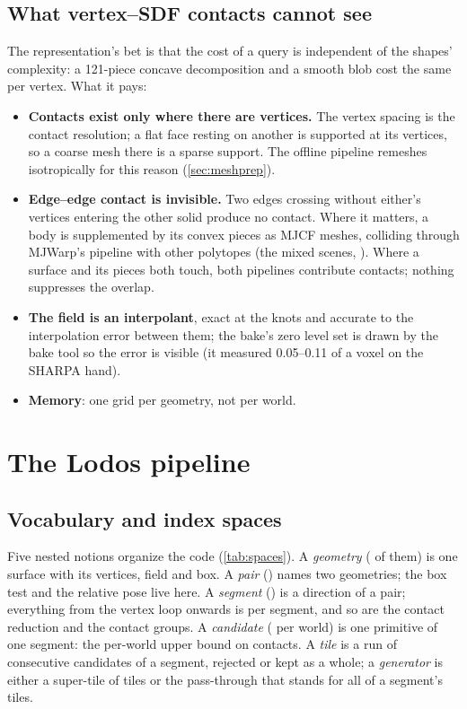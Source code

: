 \subsection{What vertex--SDF contacts cannot see}\label{sec:limits-vsdf}

The representation's bet is that the cost of a query is independent of the shapes' complexity: a 121-piece concave decomposition and a smooth blob cost the same per vertex. What it pays:

\begin{itemize}
\item \textbf{Contacts exist only where there are vertices.} The vertex spacing is the contact resolution; a flat face resting on another is supported at its vertices, so a coarse mesh there is a sparse support. The offline pipeline remeshes isotropically for this reason (\cref{sec:meshprep}).
\item \textbf{Edge--edge contact is invisible.} Two edges crossing without either's vertices entering the other solid produce no contact. Where it matters, a body is supplemented by its convex pieces as MJCF meshes, colliding through MJWarp's pipeline with other polytopes (the mixed scenes, ). Where a surface and its pieces both touch, both pipelines contribute contacts; nothing suppresses the overlap.
\item \textbf{The field is an interpolant}, exact at the knots and accurate to the interpolation error between them; the bake's zero level set is drawn by the bake tool so the error is visible (it measured 0.05--0.11 of a voxel on the SHARPA hand).
\item \textbf{Memory}: one grid per geometry, not per world.
\end{itemize}

\section{The Lodos pipeline}\label{sec:pipeline}

\subsection{Vocabulary and index spaces}\label{sec:vocab}

Five nested notions organize the code (\cref{tab:spaces}). A \emph{geometry} ( of them) is one surface with its vertices, field and box. A \emph{pair} () names two geometries; the box test and the relative pose live here. A \emph{segment} () is a direction of a pair; everything from the vertex loop onwards is per segment, and so are the contact reduction and the contact groups. A \emph{candidate} ( per world) is one primitive of one segment: the per-world upper bound on contacts. A \emph{tile} is a run of  consecutive candidates of a segment, rejected or kept as a whole; a \emph{generator} is either a super-tile of tiles or the pass-through that stands for all of a segment's tiles.

